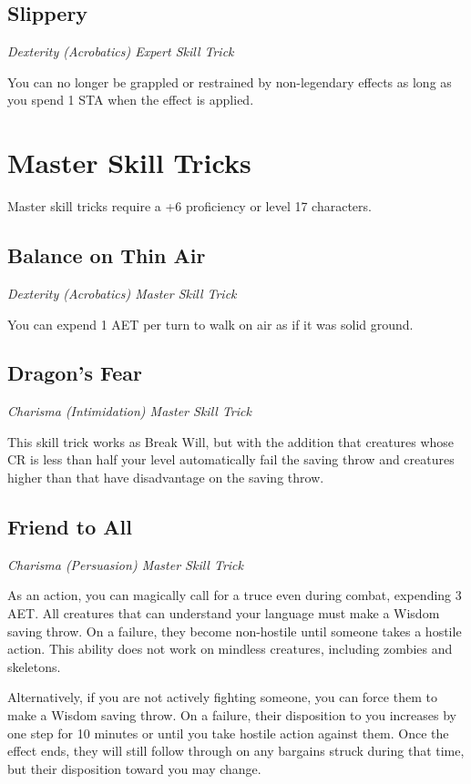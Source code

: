 \subsection{Slippery}

\textit{Dexterity (Acrobatics) Expert Skill Trick}

You can no longer be grappled or restrained by non-legendary effects as long as you spend 1 STA when the effect is applied.

\section{Master Skill Tricks}
\label{sec:skill-tricks-master}

Master skill tricks require a +6 proficiency or level 17 characters.
\subsection{Balance on Thin Air}

\textit{Dexterity (Acrobatics) Master Skill Trick}

You can expend 1 AET per turn to walk on air as if it was solid ground.

\subsection{Dragon's Fear}

\textit{Charisma (Intimidation) Master Skill Trick}

This skill trick works as Break Will, but with the addition that creatures whose CR is less than half your level automatically fail the saving throw and creatures higher than that have disadvantage on the saving throw.

\subsection{Friend to All}

\textit{Charisma (Persuasion) Master Skill Trick}

As an action, you can magically call for a truce even during combat, expending 3 AET. All creatures that can understand your language must make a Wisdom saving throw. On a failure, they become non-hostile until someone takes a hostile action. This ability does not work on mindless creatures, including zombies and skeletons.

Alternatively, if you are not actively fighting someone, you can force them to make a Wisdom saving throw. On a failure, their disposition to you increases by one step for 10 minutes or until you take hostile action against them. Once the effect ends, they will still follow through on any bargains struck during that time, but their disposition toward you may change.

